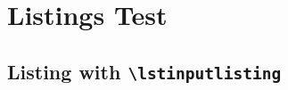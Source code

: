 \section{Listings Test}
        \subsection{Listing with \texttt{\textbackslash lstinputlisting}}
        






    
    
    

    
    
    






